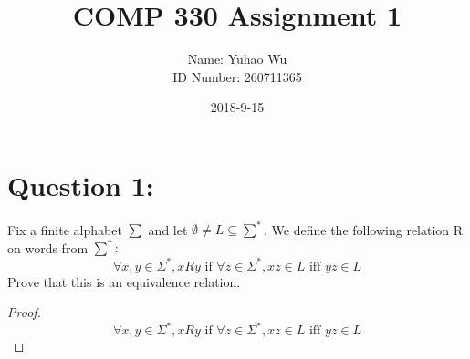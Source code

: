 \documentclass [9 pt]{article}
\theoremstyle{definition}
\begin{document}
\title{COMP 330 Assignment 1}
\date{2018-9-15}
\author{Name: Yuhao Wu\\
ID Number: 260711365
}
\maketitle

\section*{Question 1:}
Fix a finite alphabet $\sum$ and let $\emptyset \neq L \subseteq \sum^{*}$. We define the following relation R on words from $\sum^{*}:$
$$ \forall x, y \in \Sigma^{*}, xRy \text{ if }\forall z \in \Sigma^{*}, xz \in L \text{ iff } yz \in L $$
Prove that this is an equivalence relation.
\begin{proof}
	$$ \forall x, y \in \Sigma^{*}, xRy \text{ if }\forall z \in \Sigma^{*}, xz \in L \text{ iff } yz \in L $$
	

\end{proof}
\end{document}
